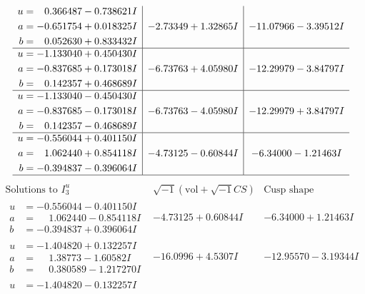 \documentclass[1p]{elsarticle_modified}
\theoremstyle{definition}
\newcommand{\I}{\sqrt{-1}}
\begin{document}
$$\begin{array}{c|c|c}
\begin{aligned}
u &= \phantom{-}0.366487 - 0.738621 I \\
a &= -0.651754 + 0.018325 I \\
b &= \phantom{-}0.052630 + 0.833432 I\end{aligned}
 & -2.73349 + 1.32865 I & -11.07966 - 3.39512 I \\ \hline\begin{aligned}
u &= -1.133040 + 0.450430 I \\
a &= -0.837685 + 0.173018 I \\
b &= \phantom{-}0.142357 + 0.468689 I\end{aligned}
 & -6.73763 + 4.05980 I & -12.29979 - 3.84797 I \\ \hline\begin{aligned}
u &= -1.133040 - 0.450430 I \\
a &= -0.837685 - 0.173018 I \\
b &= \phantom{-}0.142357 - 0.468689 I\end{aligned}
 & -6.73763 - 4.05980 I & -12.29979 + 3.84797 I \\ \hline\begin{aligned}
u &= -0.556044 + 0.401150 I \\
a &= \phantom{-}1.062440 + 0.854118 I \\
b &= -0.394837 - 0.396064 I\end{aligned}
 & -4.73125 - 0.60844 I & -6.34000 - 1.21463 I\\
 \hline 
 \end{array}$$\newpage$$\begin{array}{c|c|c}  
\text{Solutions to }I^u_{3}& \I (\text{vol} + \sqrt{-1}CS) & \text{Cusp shape}\\
 \hline 
\begin{aligned}
u &= -0.556044 - 0.401150 I \\
a &= \phantom{-}1.062440 - 0.854118 I \\
b &= -0.394837 + 0.396064 I\end{aligned}
 & -4.73125 + 0.60844 I & -6.34000 + 1.21463 I \\ \hline\begin{aligned}
u &= -1.404820 + 0.132257 I \\
a &= \phantom{-}1.38773 - 1.60582 I \\
b &= \phantom{-}0.380589 - 1.217270 I\end{aligned}
 & -16.0996 + 4.5307 I & -12.95570 - 3.19344 I \\ \hline\begin{aligned}
u &= -1.404820 - 0.132257 I \\

\end{aligned}
\end{array}$$
\end{document}
